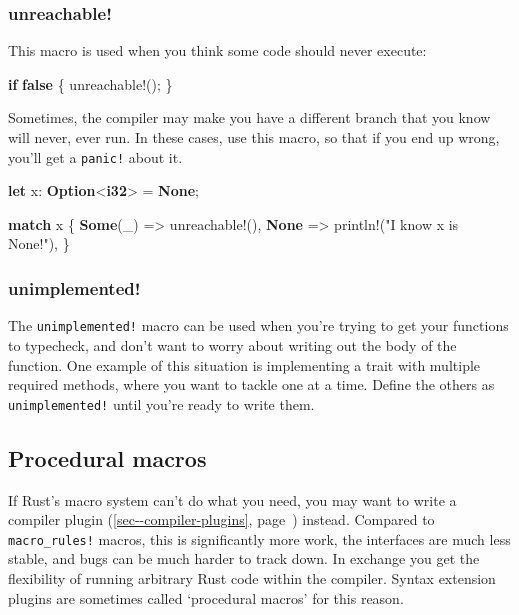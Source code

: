 \documentclass[a4paper,]{book}
\renewcommand*{\hyperref}[2][\ar]{%
  \def\ar{#2}%
  #2 (\autoref{#1}, page~\pageref{#1})}
\newenvironment{Shaded}{\begin{snugshade}}{\end{snugshade}}
\newcommand{\KeywordTok}[1]{\textcolor[rgb]{0.13,0.29,0.53}{\textbf{{#1}}}}
\newcommand{\StringTok}[1]{\textcolor[rgb]{0.31,0.60,0.02}{{#1}}}
\newcommand{\OtherTok}[1]{\textcolor[rgb]{0.56,0.35,0.01}{{#1}}}
\newcommand{\NormalTok}[1]{{#1}}
\begin{document}
\subsubsection{unreachable!}\label{unreachable}

This macro is used when you think some code should never execute:

\begin{Shaded}
\begin{Highlighting}[]
\KeywordTok{if} \KeywordTok{false} \NormalTok{\{}
    \OtherTok{unreachable!}\NormalTok{();}
\NormalTok{\}}
\end{Highlighting}
\end{Shaded}

Sometimes, the compiler may make you have a different branch that you
know will never, ever run. In these cases, use this macro, so that if
you end up wrong, you'll get a \texttt{panic!} about it.

\begin{Shaded}
\begin{Highlighting}[]
\KeywordTok{let} \NormalTok{x: }\KeywordTok{Option}\NormalTok{<}\KeywordTok{i32}\NormalTok{> = }\KeywordTok{None}\NormalTok{;}

\KeywordTok{match} \NormalTok{x \{}
    \KeywordTok{Some}\NormalTok{(_) => }\OtherTok{unreachable!}\NormalTok{(),}
    \KeywordTok{None} \NormalTok{=> }\OtherTok{println!}\NormalTok{(}\StringTok{"I know x is None!"}\NormalTok{),}
\NormalTok{\}}
\end{Highlighting}
\end{Shaded}

\subsubsection{unimplemented!}\label{unimplemented}

The \texttt{unimplemented!} macro can be used when you're trying to get
your functions to typecheck, and don't want to worry about writing out
the body of the function. One example of this situation is implementing
a trait with multiple required methods, where you want to tackle one at
a time. Define the others as \texttt{unimplemented!} until you're ready
to write them.

\subsection{Procedural macros}\label{procedural-macros}

If Rust's macro system can't do what you need, you may want to write a
\hyperref[sec--compiler-plugins]{compiler plugin} instead. Compared to
\texttt{macro\_rules!} macros, this is significantly more work, the
interfaces are much less stable, and bugs can be much harder to track
down. In exchange you get the flexibility of running arbitrary Rust code
within the compiler. Syntax extension plugins are sometimes called
`procedural macros' for this reason.
\end{document}
